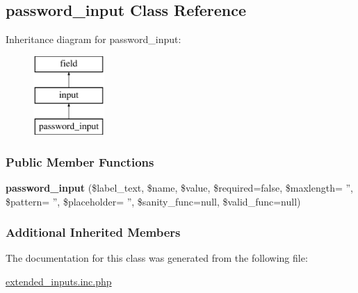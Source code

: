 \hypertarget{classpassword__input}{\subsection{password\-\_\-input Class Reference}
\label{classpassword__input}
}
Inheritance diagram for password\-\_\-input\-:\begin{figure}[H]
\begin{center}
\leavevmode
\includegraphics[height=3.000000cm]{classpassword__input}
\end{center}
\end{figure}
\subsubsection*{Public Member Functions}
\begin{DoxyCompactItemize}
\item 
\hypertarget{classpassword__input_a0cd8a0e2b305246b896256b7ad68f74d}{{\bfseries password\-\_\-input} (\$label\-\_\-text, \$name, \$value, \$required=false, \$maxlength= '', \$pattern= '', \$placeholder= '', \$sanity\-\_\-func=null, \$valid\-\_\-func=null)}\label{classpassword__input_a0cd8a0e2b305246b896256b7ad68f74d}

\end{DoxyCompactItemize}
\subsubsection*{Additional Inherited Members}


The documentation for this class was generated from the following file\-:\begin{DoxyCompactItemize}
\item 
\hyperlink{extended__inputs_8inc_8php}{extended\-\_\-inputs.\-inc.\-php}\end{DoxyCompactItemize}
